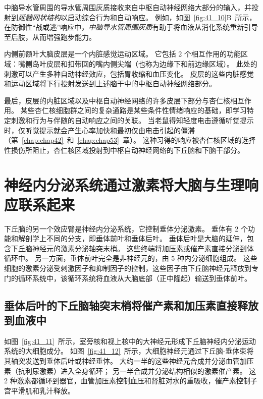 中脑导水管周围的导水管周围灰质接收来自中枢自动神经网络大部分的输入，并投射到\textit{延髓网状结构}以启动综合行为和自动响应。
例如，如图~\ref{fig:41_10}B~所示，在防御性“战或逃”响应中，\textit{中脑导水管周围灰质}有助于将血液从消化系统重新引导至后肢，从而增强跑步能力。


内侧前额叶大脑皮层是一个内脏感觉运动区域。
它包括 2 个相互作用的功能区域：嘴侧岛叶皮层和扣带回的嘴内侧尖端（也称为边缘下和前边缘区域）。
此处的刺激可以产生多种自动神经效应，包括胃收缩和血压变化。
皮层的这些内脏感觉和运动区域将下行投射发送到上述脑干中的中枢自动神经网络部分。


最后，皮层的内脏区域以及中枢自动神经网络的许多皮层下部分与杏仁核相互作用。
某些杏仁核细胞群之间的复杂通路是某些条件性情绪响应的基础，即学习特定刺激和行为与伴随的自动响应之间的关联。
当老鼠得知轻度电击遵循听觉提示时，仅听觉提示就会产生心率加快和最初仅由电击引起的僵滞（第~\ref{chap:chap42}~和~\ref{chap:chap53}~章）。
这种习得的响应被杏仁核区域的选择性损伤所阻止，杏仁核区域投射到中枢自动神经网络的下丘脑和下脑干部分。



\section{神经内分泌系统通过激素将大脑与生理响应联系起来}

下丘脑的另一个效应臂是神经内分泌系统，它控制垂体分泌激素。
垂体有 2 个功能和解剖学上不同的分支，即垂体前叶和垂体后叶。
垂体后叶是大脑的延伸，包含下丘脑神经元的激素分泌轴突末梢。
这些终端将加压素或催产素直接分泌到体循环中。
另一方面，垂体前叶完全是非神经元的，由 5 种内分泌细胞组成。
这些细胞的激素分泌受刺激因子和抑制因子的控制，这些因子由下丘脑神经元释放到专门的循环系统中，该循环系统将血液从大脑底部（正中隆起）输送到垂体前叶。



\subsection{垂体后叶的下丘脑轴突末梢将催产素和加压素直接释放到血液中}

如图~\ref{fig:41_11}~所示，室旁核和视上核中的大神经元形成下丘脑神经内分泌运动系统的大细胞成分。
如图~\ref{fig:41_12}~所示，大细胞神经元通过下丘脑-垂体束将其轴突发送到垂体后叶或神经垂体。
大约一半的这些神经元合成并分泌血管加压素（抗利尿激素）进入全身循环；
另一半合成并分泌结构相似的激素催产素。
这 2 种激素都循环到器官，血管加压素控制血压和肾脏对水的重吸收，催产素控制子宫平滑肌和乳汁释放。


